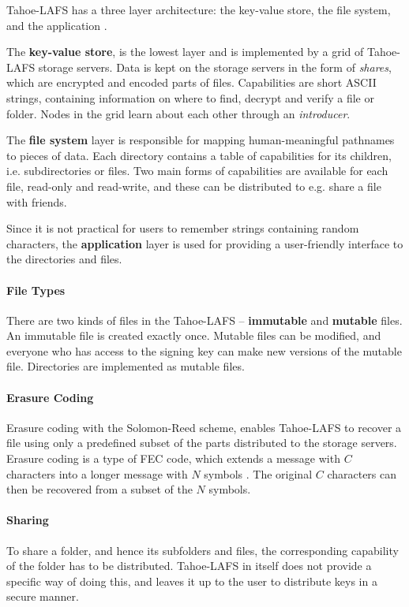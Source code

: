 \documentclass[pdftex,english,10pt,b5paper,twoside]{book}
\begin{document}
Tahoe-\ac{LAFS} has a three layer architecture: the key-value store, the file system, and
the application \cite{tahoe}.

The \textbf{key-value store}, is the lowest layer and is implemented by a grid
of Tahoe-LAFS storage servers. Data is kept on the storage servers in the form
of \emph{shares}, which are encrypted and encoded parts of files. Capabilities
are short ASCII strings, containing information on where to find, decrypt and
verify a file or folder.  Nodes in the grid learn about each other through an
\emph{introducer}.

The \textbf{file system} layer is responsible for mapping human-meaningful
pathnames to pieces of data. Each directory contains a table of capabilities
for its children, i.e. subdirectories or files. Two main forms of capabilities
are available for each file, read-only and read-write, and these can be
distributed to e.g. share a file with friends.

Since it is not practical for users to remember strings containing random
characters, the \textbf{application} layer is used for providing a user-friendly
interface to the directories and files.

\paragraph{File Types} There are two kinds of files in the Tahoe-\ac{LAFS} --
\textbf{immutable} and \textbf{mutable} files. An immutable file is created
exactly once. Mutable files can be modified, and everyone who has access to the
signing key can make new versions of the mutable file. Directories are
implemented as mutable files.

\paragraph{Erasure Coding} Erasure coding with the Solomon-Reed scheme, enables
Tahoe-\ac{LAFS} to recover a file using only a predefined subset of the parts
distributed to the storage servers. Erasure coding is a type of \ac{FEC} code,
which extends a message with $C$ characters into a longer message with $N$
symbols \cite{t_reed-solomon}. The original $C$ characters can then be
recovered from a subset of the $N$ symbols.

\paragraph{Sharing} To share a folder, and hence its subfolders and files, the
corresponding capability of the folder has to be distributed. Tahoe-\ac{LAFS}
in itself does not provide a specific way of doing this, and leaves it up to
the user to distribute keys in a secure manner.
\end{document}
